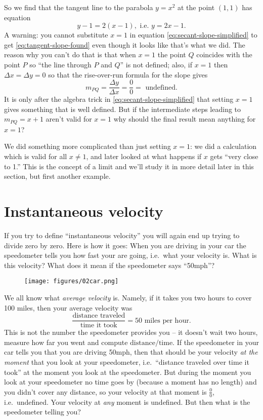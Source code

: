 So we find that the tangent line to the parabola $y=x^2$ at the point $(1,1)$ has equation
\[
y-1 = 2 (x-1), \text{~i.e.~} y=2x-1.
\]
A warning: you cannot substitute $x=1$ in equation \eqref{eq:secant-slope-simplified} to
get \eqref{eq:tangent-slope-found} even though it looks like that's what we did.  The
reason why you can't do that is that when $x=1$ the point $Q$ coincides with the point $P$
so ``the line through $P$ and $Q$'' is not defined; also, if $x=1$ then $\Delta x=\Delta y
=0$ so that the rise-over-run formula for the slope gives
\[
m_{PQ} = \frac{\Delta y}{\Delta x} = \frac 00 = \text{~undefined.}
\]
It is only after the algebra trick in \eqref{eq:secant-slope-simplified} that setting
$x=1$ gives something that is well defined.  But if the intermediate steps leading to
$m_{PQ}=x+1$ aren't valid for $x=1$ why should the final result mean anything for $x=1$?

We did something more complicated than just setting $x=1$: we did a calculation which is
valid for all $x\neq 1$, and later looked at what happens if $x$ gets ``very close to 1.''
 This is the concept of a limit and we'll study it in more detail later in this section,
but first another example.


\section{Instantaneous velocity}
If you try to define ``instantaneous velocity'' you will again end up trying to divide
zero by zero.  Here is how it goes: When you are driving in your car the speedometer tells
you how fast your are going, i.e.\ what your velocity is.  What is this velocity?  What
does it mean if the speedometer says ``50mph''?

\smallskip

\begin{figure}[h]
  \texttt{[image: figures/02car.png]}
\end{figure}

\smallskip

We all know what \emph{average velocity} is.  Namely, if it takes you two hours to cover
100 miles, then your average velocity was
\[
\frac{\text{distance traveled}}{\text{time it took}} = 50 \text{ miles per
  hour}.
\]
This is not the number the speedometer provides you -- it doesn't wait two hours, measure
how far you went and compute $\text{distance}/\text{time}$. If the speedometer in your car
tells you that you are driving 50mph, then that should be your velocity \emph{at the
moment} that you look at your speedometer, i.e.\ ``distance traveled over time it took''
at the moment you look at the speedometer.  But during the moment you look at your
speedometer no time goes by (because a moment has no length) and you didn't cover any
distance, so your velocity at that moment is $\frac00$, i.e.\ undefined.  Your velocity at
\emph{any} moment is undefined.  But then what is the speedometer telling you?

